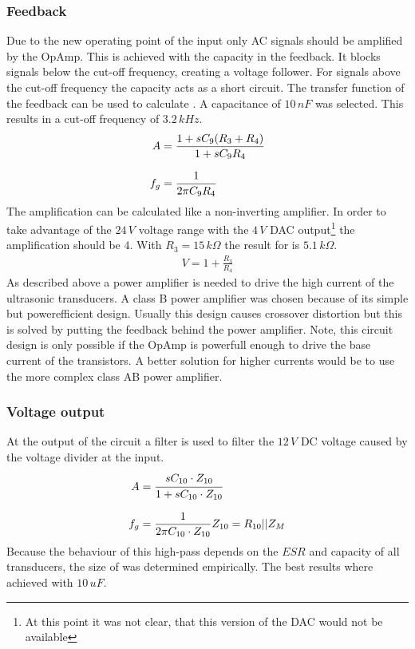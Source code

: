 \subsubsection*{Feedback}
%
Due to the new operating point of the input only AC signals should be amplified by the OpAmp. This is achieved with the capacity  in the feedback. It blocks signals below the cut-off frequency, creating a voltage follower. For signals above the cut-off frequency the capacity  acts as a short circuit. The transfer function of the feedback can be used to calculate . A capacitance of $10\,nF$ was selected. This results in a cut-off frequency of $3.2\,kHz$.
%
\begin{align}
  A &= \frac{1 + s C_9 (R_3 + R_4)}{1 + s C_9 R_4}\pmath
  f_g &= \frac{1}{2 \pi C_9 R_4}
\end{align}
%
The amplification can be calculated like a non-inverting amplifier. In order to take advantage of the $24\,V$ voltage range with the $4\,V$ DAC output\footnote{At this point it was not clear, that this version of the DAC would not be available} the amplification should be $4$. With $R_3 = 15\,k\Omega$ the result for  is $5.1\,k\Omega$.
%
\begin{align}
  V = 1 + \frac{R_3}{R_4}
\end{align}
%
As described above a power amplifier is needed to drive the high current of the ultrasonic transducers. A class B power amplifier was chosen because of its simple but powerefficient design.\cite{okorn_halbleiterschaltung_2020} Usually this design causes crossover distortion but this is solved by putting the feedback behind the power amplifier. Note, this circuit design is only possible if the OpAmp is powerfull enough to drive the base current of the transistors. A better solution for higher currents would be to use the more complex class AB power amplifier.
\subsubsection*{Voltage output}
At the output of the circuit a   filter is used to filter the $12\,V$ DC voltage caused by the voltage divider at the input.
%
\begin{align}
  A &= \cfrac{sC_{10} \cdot Z_{10}}{1 + sC_{10} \cdot Z_{10}} \pmath
  f_g &= \frac{1}{2 \pi C_{10} \cdot Z_{10}}
  Z_{10} = R_{10} || Z_M
\end{align}
%
Because the behaviour of this high-pass depends on the $ESR$ and capacity of all transducers, the size of  was determined empirically. The best results where achieved with $10\,uF$.

